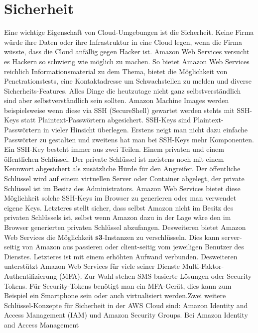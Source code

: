 \documentclass[titlepage]{report}
\begin{document}
\section*{Sicherheit}
Eine wichtige Eigenschaft von Cloud\hyp{}Umgebungen ist die Sicherheit.
Keine Firma würde ihre Daten oder ihre Infrastruktur in eine Cloud
legen, wenn die Firma wüsste, dass die Cloud anfällig gegen Hacker ist.
Amazon Web Services versucht es Hackern so schwierig wie möglich zu
machen. So bietet Amazon Web Services reichlich Informationsmaterial zu
dem Thema, bietet die Möglichkeit von
Penetrationstests\cite{penetration}, eine Kontaktadresse um
Schwachstellen zu melden und diverse Sicherheits\hyp{}Features. Alles
Dinge die heutzutage nicht ganz selbstverständlich sind aber
selbstverständlich sein sollten.  Amazon Machine Images werden
beispielsweise wenn diese via SSH (SecureShell) gewartet werden stehts
mit SSH\hyp{}Keys statt Plaintext\hyp{}Passwörtern abgesichert.
SSH\hyp{}Keys sind Plaintext\hyp{}Passwörtern in vieler Hinsicht
überlegen. Erstens neigt man nicht dazu einfache Passwörter zu gestalten
und zweitens hat man bei SSH\hyp{}Keys mehr Komponenten. Ein
SSH\hyp{}Key besteht immer aus zwei Teilen. Einem privaten und einem
öffentlichen Schlüssel. Der private Schlüssel ist meistens noch mit
einem Kennwort abgesichert als zusätzliche Hürde für den Angreifer. Der
öffentliche Schlüssel wird auf einem virtuellen Server oder Container
abgelegt, der private Schlüssel ist im Besitz des Administrators. Amazon
Web Services bietet diese Möglichkeit solche SSH\hyp{}Keys im Browser zu
generieren oder man verwendet eigene Keys. Letzteres stellt sicher, dass
selbst Amazon nicht im Besitz des privaten Schlüssels ist, selbst wenn
Amazon dazu in der Lage wäre den im Browser generierten privaten
Schlüssel abzufangen.  Desweiteren bietet Amazon Web Services die
Möglichkeit \textbf{s3}\hyp{}Instanzen zu verschlüsseln. Dies kann
server\hyp{}seitig von Amazon aus passieren oder client\hyp{}seitig vom
jeweiligen Benutzer des Dienstes.\cite{encryption} Letzteres ist mit
einem erhöhten Aufwand verbunden. Desweiteren unterstützt Amazon Web
Services für viele seiner Dienste
Multi\hyp{}Faktor\hyp{}Authentifizierung (MFA). Zur Wahl stehen
SMS\hyp{}basierte Lösungen oder Security\hyp{}Tokens. Für
Security\hyp{}Tokens benötigt man ein MFA\hyp{}Gerät, dies kann zum
Beispiel ein Smartphone sein oder auch virtualisiert
werden.\cite{mfa}Zwei weitere Schlüssel\hyp{}Konzepte für Sicherheit
in der AWS Cloud sind: Amazon Identity and Access Management (IAM) und
Amazon Security Groups. Bei Amazon Identity and Access Management
\end{document}

